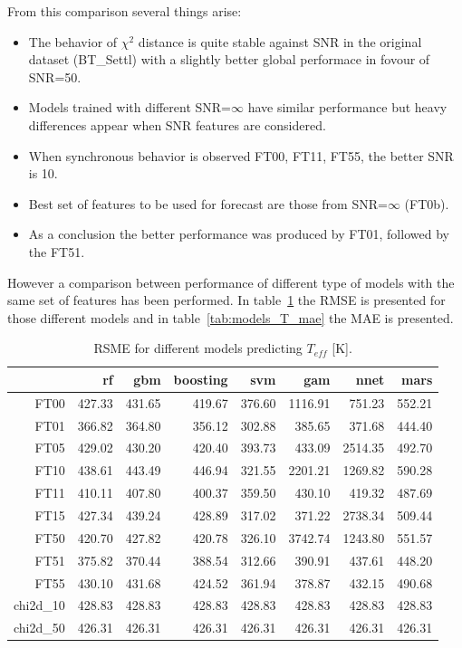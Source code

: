 {From this comparison several things arise:
\begin{itemize}
 \item {The behavior of $\chi^2$ distance is quite stable against SNR 
	in the original dataset (BT\_Settl) with a slightly better global 
	performace in fovour of SNR=50.}
 \item {Models trained with different SNR=$\infty$ have similar performance but heavy 
	differences appear when SNR features are considered.}
 \item {When synchronous behavior is observed FT00, FT11, FT55, the better SNR is 10.}
 \item {Best set of features to be used for forecast are those from SNR=$\infty$ (FT0b).}
 \item {As a conclusion the better performance was produced by FT01, followed by the FT51.}
\end{itemize}

However a comparison between performance of different type of models with the same
set of features has been performed. In table~\ref{tab:models_T_rmse} the RMSE is presented for 
those different models and in table~\ref{tab:models_T_mae} the MAE is presented.

\begin{table}[ht]
\centering
\begin{tabular}{rrrrrrrr}
  \hline
 & rf & gbm & boosting & svm & gam & nnet & mars \\ 
  \hline
  FT00 & 427.33 & 431.65 & 419.67 & 376.60 & 1116.91 & 751.23 & 552.21 \\ 
  FT01 & 366.82 & 364.80 & 356.12 & 302.88 & 385.65 & 371.68 & 444.40 \\ 
  FT05 & 429.02 & 430.20 & 420.40 & 393.73 & 433.09 & 2514.35 & 492.70 \\ 
  FT10 & 438.61 & 443.49 & 446.94 & 321.55 & 2201.21 & 1269.82 & 590.28 \\ 
  FT11 & 410.11 & 407.80 & 400.37 & 359.50 & 430.10 & 419.32 & 487.69 \\ 
  FT15 & 427.34 & 439.24 & 428.89 & 317.02 & 371.22 & 2738.34 & 509.44 \\ 
  FT50 & 420.70 & 427.82 & 420.78 & 326.10 & 3742.74 & 1243.80 & 551.57 \\ 
  FT51 & 375.82 & 370.44 & 388.54 & 312.66 & 390.91 & 437.61 & 448.20 \\ 
  FT55 & 430.10 & 431.68 & 424.52 & 361.94 & 378.87 & 432.15 & 490.68 \\ 
  chi2d\_10 & 428.83 & 428.83 & 428.83 & 428.83 & 428.83 & 428.83 & 428.83 \\ 
  chi2d\_50 & 426.31 & 426.31 & 426.31 & 426.31 & 426.31 & 426.31 & 426.31 \\ 
   \hline
\end{tabular}
\caption { RSME for different models predicting $T_{eff}$ [K].} 
\label{tab:models_T_rmse} 
\end{table}

}
